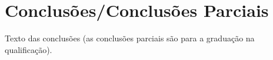 \chapter{Conclusões/Conclusões Parciais}
\label{cap:05}

Texto das conclusões (as conclusões parciais são para a graduação na qualificação).
